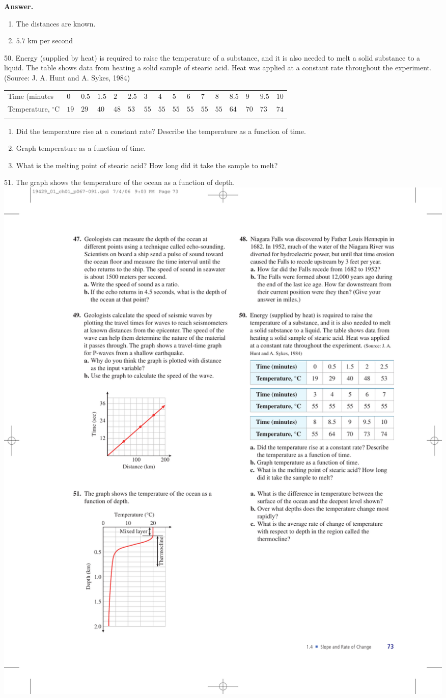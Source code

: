 \documentclass[10pt,]{book}
\theoremstyle{plain}
\theoremstyle{definition}
\theoremstyle{definition}
\theoremstyle{definition}
\theoremstyle{definition}
\numberwithin{equation}{part}
\newcommand{\hrulethin}  {\noalign{\hrule height 0.04em}}
\newcommand{\hrulethick} {\noalign{\hrule height 0.11em}}
\newcommand\degree[0]{^{\circ}}
\begin{document}
\begin{exerciselist}
%
\par\smallskip
\par\smallskip
\noindent\textbf{Answer.}\hypertarget{answer-150}{}\quad
\leavevmode%
\begin{enumerate}[label=*\alph**]
\item\hypertarget{li-1044}{}The distances are known.%
\item\hypertarget{li-1045}{}\(5.7\) km per second%
\end{enumerate}
%
\item[50.]\hypertarget{exercise-265}{}Energy (supplied by heat) is required to raise the temperature of a substance, and it is also needed to melt a solid substance to a liquid. The table shows data from heating a solid sample of stearic acid. Heat was applied at a constant rate throughout the experiment. (Source: J. A. Hunt and A. Sykes, 1984) \leavevmode%
\begin{table}
\centering
\begin{tabular}{AlA}\hrulethick
Time (minutes&\(0\)&\(0.5\)&\(1.5\)&\(2\)&\(2.5\)&\(3\)&\(4\)&\(5\)&\(6\)&\(7\)&\(8\)&\(8.5\)&\(9\)&\(9.5\)&\(10\)\tabularnewline\hrulethin
Temperature, \(\degree\)C&\(19 \)&\(29\)&\(40\)&\(48\)&\(53\)&\(55\)&\(55\)&\(55 \)&\(55\)&\(55\)&\(55\)&\(64\)&\(70\)&\(73\)&\(74\)\tabularnewline\hrulethin
\end{tabular}
\end{table}
 \leavevmode%
\begin{enumerate}[label=*\alph**]
\item\hypertarget{li-1046}{}Did the temperature rise at a constant rate? Describe the temperature as a function of time.%
\item\hypertarget{li-1047}{}Graph temperature as a function of time.%
\item\hypertarget{li-1048}{}What is the melting point of stearic acid? How long did it take the sample to melt?%
\end{enumerate}
%
\par\smallskip
\item[51.]\hypertarget{exercise-266}{}The graph shows the temperature of the ocean as a function of depth. \includegraphics[width=0.4\linewidth]{images/fig-ex-1-4-51}

\end{exerciselist}
\end{document}
